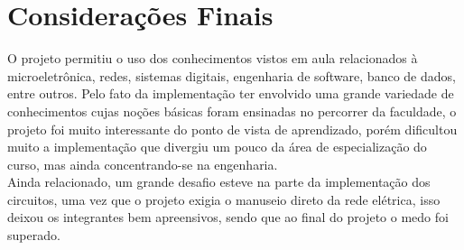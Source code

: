 \chapter{Considerações Finais}
\label{Cap:consideracoes_finais}

O projeto permitiu o uso dos conhecimentos vistos em aula relacionados à microeletrônica, redes, sistemas digitais, engenharia de software, banco de dados, entre outros. Pelo fato da implementação ter envolvido uma grande variedade de conhecimentos cujas noções básicas foram ensinadas no percorrer da faculdade, o projeto foi muito interessante do ponto de vista de aprendizado, porém dificultou muito a implementação que divergiu um pouco da área de especialização do curso, mas ainda concentrando-se na engenharia.\\
Ainda relacionado, um grande desafio esteve na parte da implementação dos circuitos, uma vez que o projeto exigia o manuseio direto da rede elétrica, isso deixou os integrantes bem apreensivos, sendo que ao final do projeto o medo foi superado.